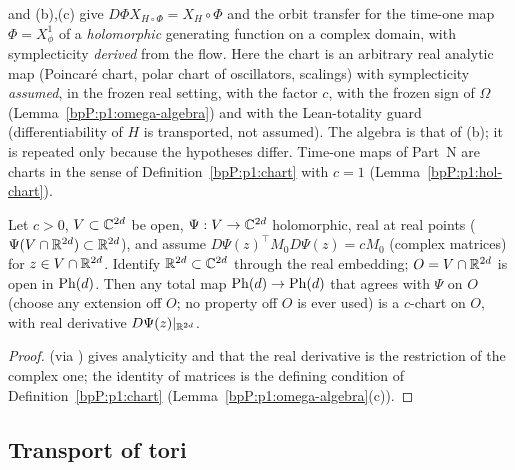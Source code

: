 \begin{remark}\label{bpP:p1:vs-N}
 and (b),(c) give $D\Phi X_{H\circ\Phi}=X_H\circ\Phi$ and the orbit transfer for the time-one map $\Phi=X^1_\phi$ of a \emph{holomorphic} generating function on a complex domain, with symplecticity \emph{derived} from the flow. Here the chart is an arbitrary real analytic map (Poincar\'e chart, polar chart of oscillators, scalings) with symplecticity \emph{assumed}, in the frozen real setting, with the factor $c$, with the frozen sign of $\Omega$ (Lemma~\ref{bpP:p1:omega-algebra}) and with the Lean-totality guard (differentiability of $H$ is transported, not assumed). The algebra is that of (b); it is repeated only because the hypotheses differ. Time-one maps of Part~N are charts in the sense of Definition~\ref{bpP:p1:chart} with $c=1$ (Lemma~\ref{bpP:p1:hol-chart}).
\end{remark}

\begin{lemma}\label{bpP:p1:hol-chart}
Let $c>0$, $V\subset\mathbb{C}^{2d}$ be open, $\Psi:V\to\mathbb{C}^{2d}$ holomorphic, real at real points ($\Psi(V\cap\mathbb{R}^{2d})\subset\mathbb{R}^{2d}$), and assume $D\Psi(z)^{\top}M_0D\Psi(z)=cM_0$ (complex matrices) for $z\in V\cap\mathbb{R}^{2d}$. Identify $\mathbb{R}^{2d}\subset\mathbb{C}^{2d}$ through the real embedding; $O=V\cap\mathbb{R}^{2d}$ is open in $\mathrm{Ph}(d)$. Then any total map $\mathrm{Ph}(d)\to\mathrm{Ph}(d)$ that agrees with $\Psi$ on $O$ (choose any extension off $O$; no property off $O$ is ever used) is a $c$-chart on $O$, with real derivative $D\Psi(z)|_{\mathbb{R}^{2d}}$.
\end{lemma}
\begin{proof}
 (via ) gives analyticity and that the real derivative is the restriction of the complex one; the identity of matrices is the defining condition of Definition~\ref{bpP:p1:chart} (Lemma~\ref{bpP:p1:omega-algebra}(c)).
\end{proof}

\subsection{Transport of tori}\label{bpP:p1:transport}

